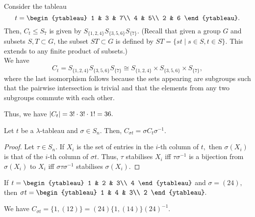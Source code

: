\begin{ex}
	Consider the tableau
	\begin{equation*} 
		t = \begin{ytableau}
			1 & 3 & 7\\
			4 & 5\\
			2 & 6
		\end{ytableau}.
	\end{equation*}
	Then, $C_t \le S_7$ is given by $S_{\{1, 2, 4\}}S_{\{3, 5, 6\}}S_{\{7\}}.$ (Recall that given a group $G$ and subsets $S, T \subset G$, the subset $ST \subset G$ is defined by $ST = \{st \mid s \in S, t \in S\}.$ This extends to any finite product of subsets.)\\
	We have
	\begin{equation*} 
		C_t = S_{\{1, 2, 4\}}S_{\{3, 5, 6\}}S_{\{7\}} \cong S_{\{1, 2, 4\}} \times S_{\{3, 5, 6\}} \times S_{\{7\}},
	\end{equation*}
	where the last isomorphism follows because the sets appearing are subgroups such that the pairwise intersection is trivial and that the elements from any two subgroups commute with each other.

	Thus, we have ${\left\lvert C_t \right\lvert} = 3!\cdot3!\cdot1! = 36.$
\end{ex}

\begin{lem} \label{lem:colstabrelation}
	Let $t$ be a $\lambda$-tableau and $\sigma \in S_n.$ Then, $C_{\sigma t} = \sigma C_t \sigma^{-1}.$
\end{lem}
\begin{proof} 
	Let $\tau \in S_n.$ If $X_i$ is the set of entries in the $i$-th column of $t,$ then $\sigma(X_i)$ is that of the $i$-th column of $\sigma t.$ Thus, $\tau$ stabilises $X_i$ iff $\tau\sigma^{-1}$ is a bijection from $\sigma(X_i)$ to $X_i$ iff $\sigma\tau\sigma^{-1}$ stabilises $\sigma(X_i).$
\end{proof}

\begin{ex}
	If $t = \begin{ytableau}
		1 & 2 & 3\\
		4
	\end{ytableau}$ and $\sigma = (24),$ then $\sigma t =\begin{ytableau}
		1 & 4 & 3\\
		2
	\end{ytableau}.$

	We have $C_{\sigma t} = \{1, (12)\} = (24)\{1, (14)\}(24)^{-1}.$
\end{ex}

